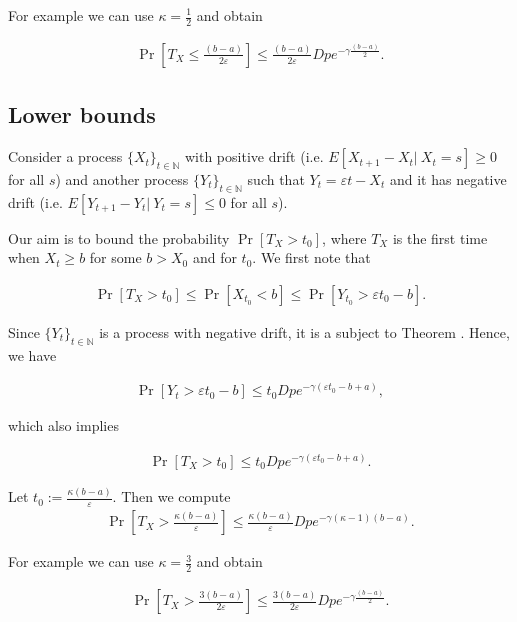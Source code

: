 \documentclass[12pt, a4paper]{article}
\theoremstyle{remark}
\theoremstyle{definition}
\begin{document}
For example we can use $\kappa = \frac{1}{2}$ and obtain

\begin{align*}
    \Pr\left[T_X \leq \frac{(b - a)}{2\varepsilon}\right] \leq \frac{(b - a)}{2\varepsilon} D p e^{-\gamma\frac{(b - a)}{2}}.
\end{align*}

\subsection{Lower bounds}

Consider a process $\{X_t\}_{t \in \mathbb{N}}$ with positive drift (i.e. $E[X_{t + 1} - X_t |\ X_t = s] \geq 0$ for all $s$) and another process $\{Y_t\}_{t \in \mathbb{N}}$ such that $Y_t = \varepsilon t - X_t$ and it has negative drift (i.e. $E[Y_{t + 1} - Y_t |\ Y_t = s] \leq 0$ for all $s$).

Our aim is to bound the probability $\Pr[T_X > t_0]$, where $T_X$ is the first time when $X_t \geq b$ for some $b > X_0$ and for $t_0$. We first note that

\begin{align*}
    \Pr[T_X > t_0] \leq \Pr[X_{t_0} < b] \leq \Pr[Y_{t_0} > \varepsilon t_0 - b].
\end{align*}

Since $\{Y_t\}_{t \in \mathbb{N}}$ is a process with negative drift, it is a subject to Theorem \cite{}. Hence, we have

\begin{align*}
    \Pr[Y_t > \varepsilon t_0 - b] \leq t_0 D p e^{-\gamma(\varepsilon t_0 - b + a)},
\end{align*}

which also implies

\begin{align*}
    \Pr[T_X > t_0] \leq t_0 D p e^{-\gamma(\varepsilon t_0 - b + a)}.
\end{align*}

Let $t_0 := \frac{\kappa (b - a)}{\varepsilon}$. Then we compute
\begin{align*}
    \Pr\left[T_X > \frac{\kappa (b - a)}{\varepsilon}\right] \leq \frac{\kappa (b - a)}{\varepsilon} D p e^{-\gamma(\kappa - 1)(b - a)}.
\end{align*}

For example we can use $\kappa = \frac{3}{2}$ and obtain

\begin{align*}
    \Pr\left[T_X > \frac{3 (b - a)}{2\varepsilon}\right] \leq \frac{3(b - a)}{2\varepsilon} D p e^{-\gamma\frac{(b - a)}{2}}.
\end{align*}
\end{document}
